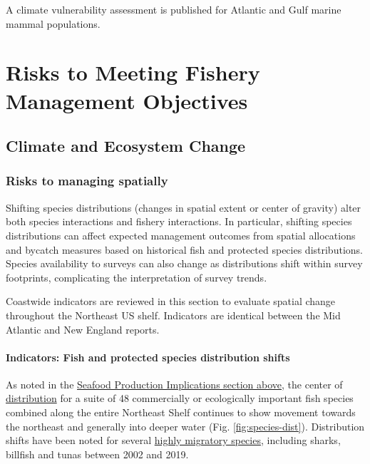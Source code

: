 \documentclass[
  10pt,
]{article}
\begin{document}
A climate vulnerability assessment is published for Atlantic and Gulf marine mammal populations.

\section{Risks to Meeting Fishery Management Objectives}\label{risks-to-meeting-fishery-management-objectives}

\subsection{Climate and Ecosystem Change}\label{climate-and-ecosystem-change}

\subsubsection{Risks to managing spatially}\label{risks-to-managing-spatially}

Shifting species distributions (changes in spatial extent or center of gravity) alter both species interactions and fishery interactions. In particular, shifting species distributions can affect expected management outcomes from spatial allocations and bycatch measures based on historical fish and protected species distributions. Species availability to surveys can also change as distributions shift within survey footprints, complicating the interpretation of survey trends.

Coastwide indicators are reviewed in this section to evaluate spatial change throughout the Northeast US shelf. Indicators are identical between the Mid Atlantic and New England reports.

\paragraph{Indicators: Fish and protected species distribution shifts}\label{indicators-fish-and-protected-species-distribution-shifts}

As noted in the \hyperref[implications]{Seafood Production Implications section above}, the center of \href{https://noaa-edab.github.io/catalog/species_dist.html}{distribution} for a suite of 48 commercially or ecologically important fish species combined along the entire Northeast Shelf continues to show movement towards the northeast and generally into deeper water (Fig. \ref{fig:species-dist}). Distribution shifts have been noted for several \href{https://noaa-edab.github.io/catalog/species_dist.html}{highly migratory species}, including sharks, billfish and tunas between 2002 and 2019.
\end{document}
